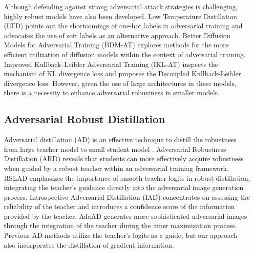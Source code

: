 \documentclass{article} %
\begin{document}
Although defending against strong adversarial attack strategies\citep{AutoAttack, croce2020minimally,andriushchenko2020square} is challenging, highly robust models have also been developed.
Low Temperature Distillation (LTD) \citep{LTD} points out the shortcomings of one-hot labels in adversarial training and advocates the use of soft labels as an alternative approach.
Better Diffusion Models for Adversarial Training (BDM-AT) \citep{wang2023better} explores methods for the more efficient utilization of diffusion models within the context of adversarial training.
Improved Kullback–Leibler Adversarial Training (IKL-AT) \citep{cui2023decoupled} inspects the mechanism of KL divergence loss and proposes the Decoupled Kullback-Leibler divergence loss.
However, given the use of large architectures in these models, there is a necessity to enhance adversarial robustness in smaller models.

\subsection{Adversarial Robust Distillation}

Adversarial distillation (AD) is an effective technique to distill the robustness from large teacher model to small student model \citep{ard, iad, akd, rslad, adaad, kuang2023improving, jung2024peeraid, yin2024adversarial, dong2025adversarially}.
Adversarial Robustness Distillation (ARD) \citep{ard} reveals that students can more effectively acquire robustness when guided by a robust teacher within an adversarial training framework. 
RSLAD \citep{rslad} emphasizes the importance of smooth teacher logits in robust distillation, integrating the teacher's guidance directly into the adversarial image generation process.
Introspective Adversarial Distillation (IAD) \citep{iad} concentrates on assessing the reliability of the teacher and introduces a confidence score of the information provided by the teacher.
AdaAD \citep{adaad} generates more sophisticated adversarial images through the integration of the teacher during the inner maximization process.
Previous AD methods utilize the teacher's logits as a guide, but our approach also incorporates the distillation of gradient information.
\end{document}
